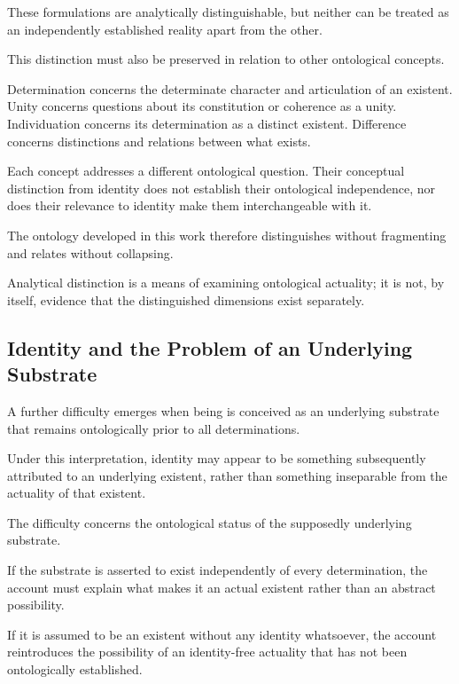 These formulations are analytically
distinguishable, but neither can be
treated as an independently established
reality apart from the other.

This distinction must also be preserved
in relation to other ontological concepts.

Determination concerns the determinate
character and articulation of an existent.
Unity concerns questions about its
constitution or coherence as a unity.
Individuation concerns its determination
as a distinct existent. Difference concerns
distinctions and relations between what
exists.

Each concept addresses a different
ontological question. Their conceptual
distinction from identity does not
establish their ontological independence,
nor does their relevance to identity
make them interchangeable with it.

The ontology developed in this work
therefore distinguishes without fragmenting
and relates without collapsing.

Analytical distinction is a means of
examining ontological actuality; it is
not, by itself, evidence that the
distinguished dimensions exist separately.



\subsection{Identity and the Problem of an Underlying Substrate}

A further difficulty emerges when being
is conceived as an underlying substrate
that remains ontologically prior to
all determinations.

Under this interpretation, identity
may appear to be something subsequently
attributed to an underlying existent,
rather than something inseparable from
the actuality of that existent.

The difficulty concerns the ontological
status of the supposedly underlying
substrate.

If the substrate is asserted to exist
independently of every determination,
the account must explain what makes
it an actual existent rather than
an abstract possibility.

If it is assumed to be an existent
without any identity whatsoever,
the account reintroduces the possibility
of an identity-free actuality that
has not been ontologically established.

